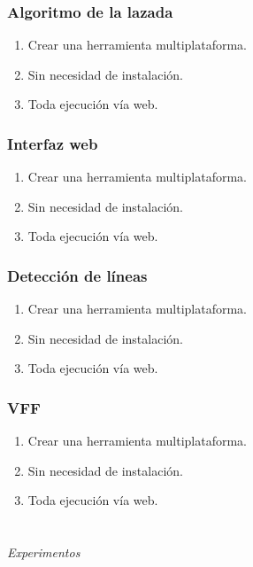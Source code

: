 \documentclass{beamer}
\begin{document}
\begin{frame}
	\frametitle{Algoritmo de la lazada}
	\begin{enumerate}
		\item Crear una herramienta multiplataforma.
		\item Sin necesidad de instalación.
		\item Toda ejecución vía web.
	\end{enumerate}
\end{frame}

\begin{frame}
	\frametitle{Interfaz web}
	\begin{enumerate}
		\item Crear una herramienta multiplataforma.
		\item Sin necesidad de instalación.
		\item Toda ejecución vía web.
	\end{enumerate}
\end{frame}

\begin{frame}
	\frametitle{Detección de líneas}
	\begin{enumerate}
		\item Crear una herramienta multiplataforma.
		\item Sin necesidad de instalación.
		\item Toda ejecución vía web.
	\end{enumerate}
\end{frame}

\begin{frame}
	\frametitle{VFF}
	\begin{enumerate}
		\item Crear una herramienta multiplataforma.
		\item Sin necesidad de instalación.
		\item Toda ejecución vía web.
	\end{enumerate}
\end{frame}
\section*{}
\begin{frame}{}
	\centering \Huge
	\emph{Experimentos}
\end{frame}
\end{document}

